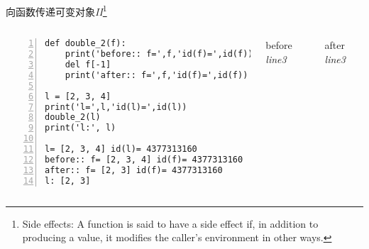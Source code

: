 \documentclass{beamer}
\begin{document}
\begin{frame}[fragile]{向函数传递可变对象\textit{II}\footnote{Side effects: A function is said to have a side effect if, in addition to producing a value, it modifies the caller's environment in other ways. }}
\begin{columns}
\begin{Verbatim}[numbers=left,frame=single,rulecolor=\color{red}]
def double_2(f):
    print('before:: f=',f,'id(f)=',id(f))
    del f[-1]
    print('after:: f=',f,'id(f)=',id(f))

l = [2, 3, 4]
print('l=',l,'id(l)=',id(l))
double_2(l)
print('l:', l)

l= [2, 3, 4] id(l)= 4377313160
before:: f= [2, 3, 4] id(f)= 4377313160
after:: f= [2, 3] id(f)= 4377313160
l: [2, 3]
\end{Verbatim}
\begin{block}{before \textit{line3}}
\end{block}
\begin{block}{after \textit{line3}}
\end{block}

\end{columns}
\end{frame}
\end{document}

